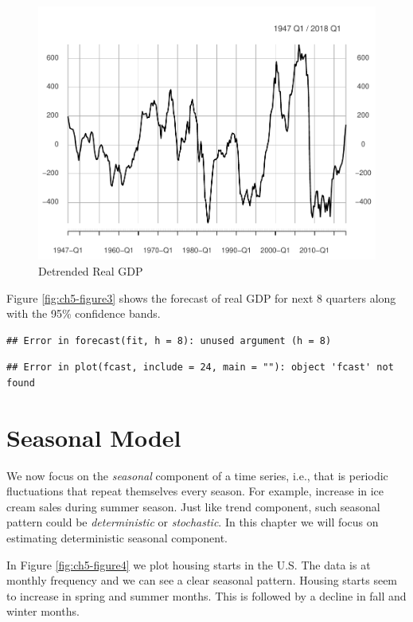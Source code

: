 \documentclass[]{book}
\theoremstyle{definition}
\theoremstyle{definition}
\theoremstyle{definition}
\theoremstyle{remark}
\begin{document}
\begin{figure}

{\centering \includegraphics[width=0.8\linewidth]{bookdown-demo_files/figure-latex/ch5-figure2-1} 

}

\caption{Detrended Real GDP}\label{fig:ch5-figure2}
\end{figure}

Figure \ref{fig:ch5-figure3} shows the forecast of real GDP for next 8
quarters along with the 95\% confidence bands.

\begin{verbatim}
## Error in forecast(fit, h = 8): unused argument (h = 8)
\end{verbatim}

\begin{verbatim}
## Error in plot(fcast, include = 24, main = ""): object 'fcast' not found
\end{verbatim}

\hypertarget{seasonal-model}{%
\section{Seasonal Model}\label{seasonal-model}}

We now focus on the \emph{seasonal} component of a time series, i.e.,
that is periodic fluctuations that repeat themselves every season. For
example, increase in ice cream sales during summer season. Just like
trend component, such seasonal pattern could be \emph{deterministic} or
\emph{stochastic}. In this chapter we will focus on estimating
deterministic seasonal component.

In Figure \ref{fig:ch5-figure4} we plot housing starts in the U.S. The
data is at monthly frequency and we can see a clear seasonal pattern.
Housing starts seem to increase in spring and summer months. This is
followed by a decline in fall and winter months.
\end{document}
